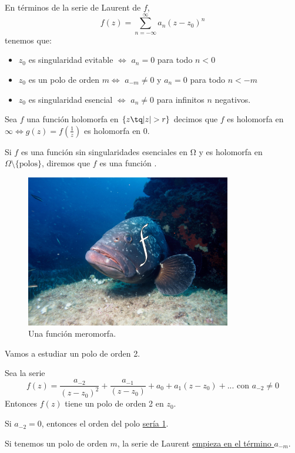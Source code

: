 \documentclass{apuntes}
\begin{document}
En términos de la serie de Laurent de $f$,
\[f(z)=\sum_{n=-\infty}^{\infty}a_n(z-z_0)^n\]
tenemos que:
\begin{itemize}
\item $z_0$ es singularidad evitable $\iff$ $a_n=0$ para todo $n < 0$
\item $z_0$ es un polo de orden $m \iff$ $a_{-m} \neq 0$ y $a_n=0$ para todo $n < -m$
\item $z_0$ es singularidad esencial $\iff$ $a_n \neq 0$ para infinitos $n$ negativos.
\end{itemize}

\obs Sea $f$ una función holomorfa en $\{z \tq |z| > r\}$ decimos que $f$ es holomorfa en $\infty \iff g(z)=f\left(\frac{1}{z}\right)$  es holomorfa en 0.

Si $f$ es una función sin singularidades esenciales en Ω y es holomorfa en $Ω \setminus\{\text{polos}\}$, diremos que $f$ es una función .

\begin{figure}[hbtp]
\centering
\includegraphics[width=0.8\textwidth]{img/FMeromorfa.jpg}
\caption{Una función meromorfa.}
\end{figure}

\begin{example} Vamos a estudiar un polo de orden 2.

Sea la serie
\[ f(z) = \frac{a_{-2}}{(z - z_0)^2} + \frac{a_{-1}}{(z - z_0)} + a_0 + a_1 (z - z_0) + ... \text{ con } a_{-2} \neq 0\]
Entonces $f(z)$ tiene un polo de orden 2 en $z_0$.

\obs Si $a_{-2} = 0$, entonces el orden del polo \underline{sería 1}.

 Si tenemos un polo de orden $m$, la serie de Laurent \underline{empieza en el término $a_{-m}$}.
\end{example}
\end{document}
